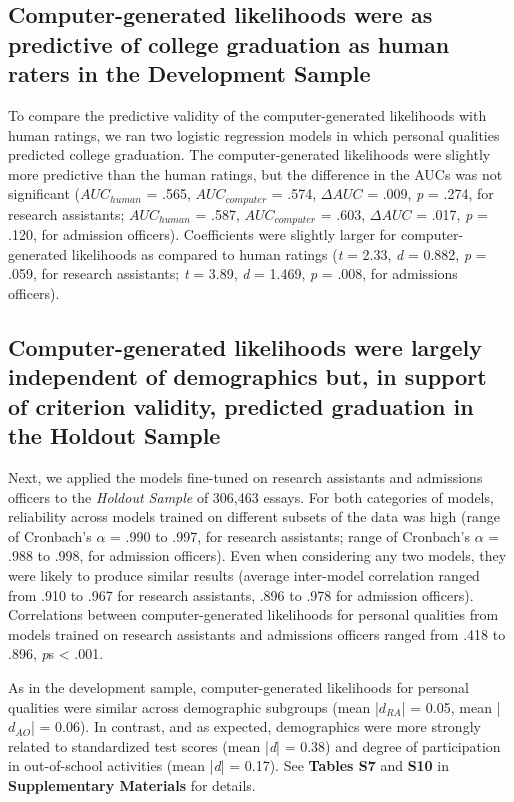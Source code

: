 \documentclass[11pt]{report}
\begin{document}
\begin{mainf}
\subsection{Computer-generated likelihoods were as predictive of college graduation as human raters in the Development Sample}
To compare the predictive validity of the computer-generated likelihoods with human ratings, we ran two logistic regression models in which personal qualities predicted college graduation. The computer-generated likelihoods were slightly more predictive than the human ratings, but the difference in the AUCs was not significant ($AUC_{human}$ = .565, $AUC_{computer}$ = .574, $\Delta AUC$ = .009, \textit{p} = .274, for research assistants; $AUC_{human}$ = .587, $AUC_{computer}$ = .603, $\Delta AUC$ = .017, \textit{p} = .120, for admission officers). Coefficients were slightly larger for computer-generated likelihoods as compared to human ratings (\textit{t} = 2.33, \textit{d} = 0.882, \textit{p} = .059, for research assistants; \textit{t} = 3.89, \textit{d} = 1.469, \textit{p} = .008, for admissions officers).

\subsection{Computer-generated likelihoods were largely independent of demographics but, in support of criterion validity, predicted graduation in the Holdout Sample}
Next, we applied the models fine-tuned on research assistants and admissions officers to the \textit{Holdout Sample} of 306,463 essays. For both categories of models, reliability across models trained on different subsets of the data was high (range of Cronbach's $\alpha$ = .990 to .997, for research assistants; range of Cronbach's $\alpha$ = .988 to .998, for admission officers). Even when considering any two models, they were likely to produce similar results (average inter-model correlation ranged from .910 to .967 for research assistants, .896 to .978 for admission officers). Correlations between computer-generated likelihoods for personal qualities from models trained on research assistants and admissions officers ranged from .418 to .896, \textit{p}s < .001.

As in the development sample, computer-generated likelihoods for personal qualities were similar across demographic subgroups (mean |$d_{RA}$| = 0.05, mean |$d_{AO}$| = 0.06). In contrast, and as expected, demographics were more strongly related to standardized test scores (mean |\textit{d}| = 0.38) and degree of participation in out-of-school activities (mean |\textit{d}| = 0.17). See \textbf{Tables S7} and \textbf{S10} in \textbf{Supplementary Materials} for details.


\end{mainf}
\end{document}
